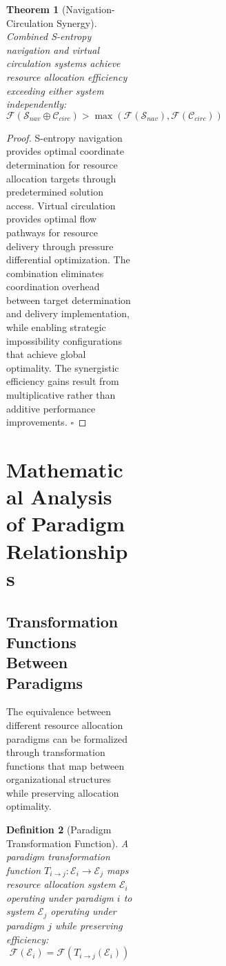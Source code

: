\documentclass[12pt,a4paper]{article}
\newtheorem{theorem}{Theorem}
\newtheorem{definition}[theorem]{Definition}
\begin{document}
\begin{figure}[H]
\begin{figure}[H]
\begin{figure}[H]
\begin{figure}[H]
\begin{theorem}[Navigation-Circulation Synergy]
Combined S-entropy navigation and virtual circulation systems achieve resource allocation efficiency exceeding either system independently:
\begin{equation}
\mathcal{F}(\mathcal{S}_{nav} \oplus \mathcal{C}_{circ}) > \max(\mathcal{F}(\mathcal{S}_{nav}), \mathcal{F}(\mathcal{C}_{circ}))
\end{equation}
\end{theorem}

\begin{proof}
S-entropy navigation provides optimal coordinate determination for resource allocation targets through predetermined solution access. Virtual circulation provides optimal flow pathways for resource delivery through pressure differential optimization. The combination eliminates coordination overhead between target determination and delivery implementation, while enabling strategic impossibility configurations that achieve global optimality. The synergistic efficiency gains result from multiplicative rather than additive performance improvements. $\square$
\end{proof}

\section{Mathematical Analysis of Paradigm Relationships}

\subsection{Transformation Functions Between Paradigms}

The equivalence between different resource allocation paradigms can be formalized through transformation functions that map between organizational structures while preserving allocation optimality.

\begin{definition}[Paradigm Transformation Function]
A paradigm transformation function $T_{i \to j} : \mathcal{E}_i \to \mathcal{E}_j$ maps resource allocation system $\mathcal{E}_i$ operating under paradigm $i$ to system $\mathcal{E}_j$ operating under paradigm $j$ while preserving efficiency:
\begin{equation}
\mathcal{F}(\mathcal{E}_i) = \mathcal{F}(T_{i \to j}(\mathcal{E}_i))
\end{equation}
\end{definition}


\end{figure}
\end{figure}
\end{figure}
\end{figure}
\end{document}
